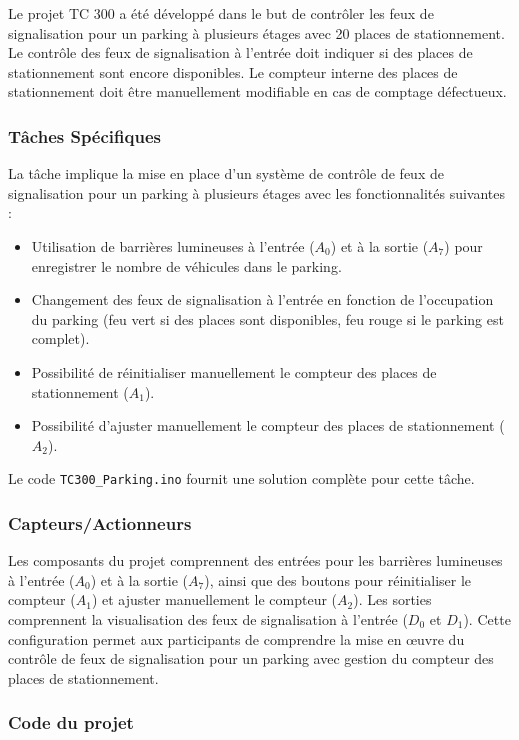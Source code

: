 \documentclass[a4paper,12pt]{report}
\begin{document}
Le projet TC 300 a été développé dans le but de contrôler les feux de signalisation pour un parking à plusieurs étages avec 20 places de stationnement. Le contrôle des feux de signalisation à l'entrée doit indiquer si des places de stationnement sont encore disponibles. Le compteur interne des places de stationnement doit être manuellement modifiable en cas de comptage défectueux.

\subsubsection{Tâches Spécifiques}

La tâche implique la mise en place d'un système de contrôle de feux de signalisation pour un parking à plusieurs étages avec les fonctionnalités suivantes :
\begin{itemize}
    \item Utilisation de barrières lumineuses à l'entrée (\(A_0\)) et à la sortie (\(A_7\)) pour enregistrer le nombre de véhicules dans le parking.
    \item Changement des feux de signalisation à l'entrée en fonction de l'occupation du parking (feu vert si des places sont disponibles, feu rouge si le parking est complet).
    \item Possibilité de réinitialiser manuellement le compteur des places de stationnement (\(A_1\)).
    \item Possibilité d'ajuster manuellement le compteur des places de stationnement (\(A_2\)).
\end{itemize}
Le code \texttt{TC300\_Parking.ino} fournit une solution complète pour cette tâche.

\subsubsection{Capteurs/Actionneurs}

Les composants du projet comprennent des entrées pour les barrières lumineuses à l'entrée (\(A_0\)) et à la sortie (\(A_7\)), ainsi que des boutons pour réinitialiser le compteur (\(A_1\)) et ajuster manuellement le compteur (\(A_2\)). Les sorties comprennent la visualisation des feux de signalisation à l'entrée (\(D_0\) et \(D_1\)). Cette configuration permet aux participants de comprendre la mise en œuvre du contrôle de feux de signalisation pour un parking avec gestion du compteur des places de stationnement.

\subsubsection{Code du projet}
\end{document}
